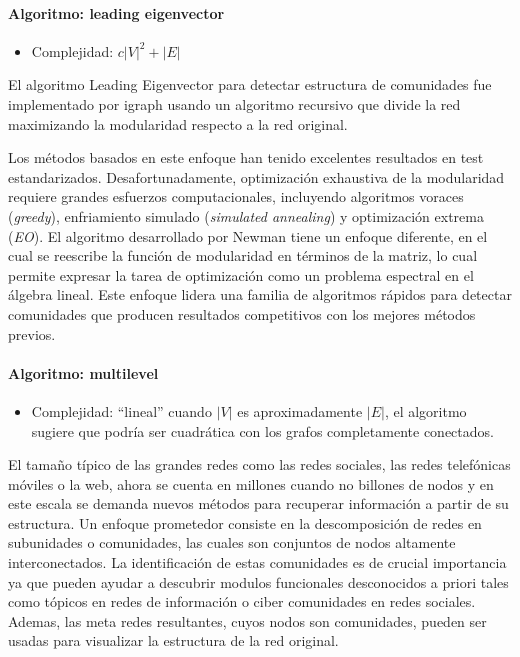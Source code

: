 \paragraph{Algoritmo: leading eigenvector}\cite{Newman2006FindingMatrices.} 
\begin{itemize}
\item Complejidad: $c|V|^2 + |E|$
\end{itemize} 
El algoritmo Leading Eigenvector para detectar estructura de comunidades fue implementado por igraph usando un algoritmo recursivo que divide la red maximizando la modularidad respecto a la red original. 
 
Los métodos basados en este enfoque han tenido excelentes resultados en test estandarizados. Desafortunadamente, optimización exhaustiva de la modularidad requiere grandes esfuerzos computacionales, incluyendo algoritmos voraces (\textit{greedy}), enfriamiento simulado (\textit{simulated annealing}) y optimización extrema (\textit{EO}). El algoritmo desarrollado por Newman tiene un enfoque diferente, en el cual se reescribe la función de modularidad en términos de la matriz, lo cual permite expresar la tarea de optimización como un problema espectral en el álgebra lineal. Este enfoque lidera una familia de algoritmos rápidos para detectar comunidades que producen resultados competitivos con los mejores métodos previos.
 
\paragraph{Algoritmo: multilevel}\cite{Blondel2008FastNetworks} 
\begin{itemize}
\item Complejidad: ``lineal'' cuando  $|V|$ es aproximadamente $|E|$, el algoritmo sugiere que podría ser cuadrática con los grafos completamente conectados.
% 
% 
\end{itemize}
El tamaño típico de las grandes redes como las redes sociales, las redes telefónicas móviles o la web, ahora se cuenta en millones cuando no billones de nodos y en este escala se demanda nuevos métodos para recuperar información a partir de su estructura. Un enfoque prometedor consiste en la descomposición de redes en subunidades o comunidades, las cuales son conjuntos de nodos altamente interconectados. La identificación de estas comunidades es de crucial importancia ya que pueden ayudar a descubrir modulos funcionales desconocidos a priori tales como tópicos en redes de información o ciber comunidades en redes sociales. Ademas, las meta redes resultantes, cuyos nodos son comunidades, pueden ser usadas para visualizar la estructura de la red original.
 
